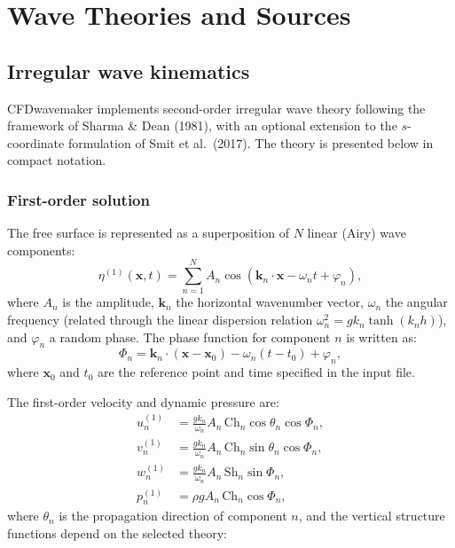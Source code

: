 \section{Wave Theories and Sources}

\subsection{Irregular wave kinematics}
\label{sec:irregular}

CFDwavemaker implements second-order irregular wave theory following the framework of Sharma \& Dean (1981), with an optional extension to the $s$-coordinate formulation of Smit et al.\ (2017). The theory is presented below in compact notation.

\subsubsection{First-order solution}
The free surface is represented as a superposition of $N$ linear (Airy) wave components:
\begin{equation}
    \eta^{(1)}(\mathbf{x},t) = \sum_{n=1}^{N} A_n \cos(\mathbf{k}_n \cdot \mathbf{x} - \omega_n t + \varphi_n),
\end{equation}
where $A_n$ is the amplitude, $\mathbf{k}_n$ the horizontal wavenumber vector, $\omega_n$ the angular frequency (related through the linear dispersion relation $\omega_n^2 = g k_n \tanh(k_n h)$), and $\varphi_n$ a random phase. The phase function for component $n$ is written as:
\begin{equation}
    \Phi_n = \mathbf{k}_n \cdot (\mathbf{x} - \mathbf{x}_0) - \omega_n (t - t_0) + \varphi_n,
\end{equation}
where $\mathbf{x}_0$ and $t_0$ are the reference point and time specified in the input file.

The first-order velocity and dynamic pressure are:
\begin{align}
    u_n^{(1)} &= \frac{g k_n}{\omega_n} A_n\, \mathrm{Ch}_n \cos\theta_n \cos\Phi_n, \\
    v_n^{(1)} &= \frac{g k_n}{\omega_n} A_n\, \mathrm{Ch}_n \sin\theta_n \cos\Phi_n, \\
    w_n^{(1)} &= \frac{g k_n}{\omega_n} A_n\, \mathrm{Sh}_n \sin\Phi_n, \\
    p_n^{(1)} &= \rho g A_n\, \mathrm{Ch}_n \cos\Phi_n,
\end{align}
where $\theta_n$ is the propagation direction of component $n$, and the vertical structure functions depend on the selected theory:

